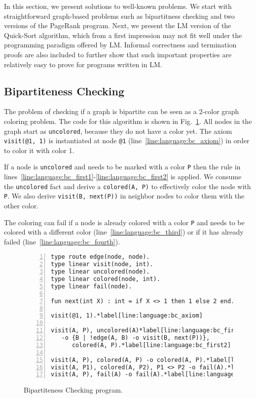 In this section, we present solutions to well-known problems. We start with
straightforward graph-based problems such as bipartitness checking and two
versions of the PageRank program. Next, we present the LM version of the
Quick-Sort algorithm, which from a first impression may not fit well under the
programming paradigm offered by LM. Informal correctness and termination proofs
are also included to further show that such important properties are relatively
easy to prove for programs written in LM.

\subsection{Bipartiteness Checking}

The problem of checking if a graph is bipartite can be seen as a 2-color graph
coloring problem.  The code for this algorithm is shown in
Fig.~\ref{language:code:bichecking}. All nodes in the graph start as
\texttt{uncolored}, because they do not have a color yet. The axiom
\texttt{visit(@1, 1)} is instantiated at node \texttt{@1}
(line~\ref{line:language:bc_axiom}) in order to color it with color 1.

If a node is \texttt{uncolored} and needs to be marked with a color \texttt{P}
then the rule in
lines~\ref{line:language:bc_first1}-\ref{line:language:bc_first2} is applied. We
consume the \texttt{uncolored} fact and derive a \texttt{colored(A, P)} to
effectively color the node with \texttt{P}. We also derive \texttt{visit(B,
next(P))} in neighbor nodes to color them with the other color. 

The coloring can fail if a node is already colored with a color \texttt{P} and
needs to be colored with a different color (line~\ref{line:language:bc_third})
or if it has already failed (line~\ref{line:language:bc_fourth}).

\begin{figure}[h!]
\begin{Verbatim}[numbers=left,fontsize=\codesize,commandchars=\*\[\]]
type route edge(node, node).
type linear visit(node, int).
type linear uncolored(node).
type linear colored(node, int).
type linear fail(node).

fun next(int X) : int = if X <> 1 then 1 else 2 end.

visit(@1, 1).*label[line:language:bc_axiom]

visit(A, P), uncolored(A)*label[line:language:bc_first1]
   -o {B | !edge(A, B) -o visit(B, next(P))},
      colored(A, P).*label[line:language:bc_first2]

visit(A, P), colored(A, P) -o colored(A, P).*label[line:language:bc_second]
visit(A, P1), colored(A, P2), P1 <> P2 -o fail(A).*label[line:language:bc_third]
visit(A, P), fail(A) -o fail(A).*label[line:language:bc_fourth]
\end{Verbatim}
  \caption{Bipartiteness Checking program.}
  \label{language:code:bichecking}
\end{figure}

